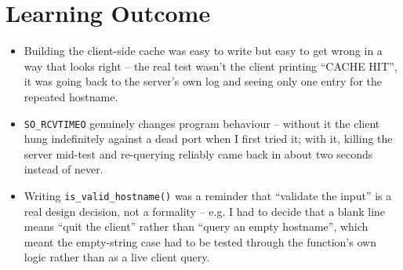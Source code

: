 \documentclass[11pt,a4paper]{article}
\begin{document}
\section*{Learning Outcome}
\begin{itemize}
\item Building the client-side cache was easy to write but easy to get wrong
in a way that looks right -- the real test wasn't the client printing
``CACHE HIT'', it was going back to the server's own log and seeing only one
entry for the repeated hostname.
\item \texttt{SO\_RCVTIMEO} genuinely changes program behaviour -- without it
the client hung indefinitely against a dead port when I first tried it; with
it, killing the server mid-test and re-querying reliably came back in about
two seconds instead of never.
\item Writing \texttt{is\_valid\_hostname()} was a reminder that ``validate
the input'' is a real design decision, not a formality -- e.g. I had to decide
that a blank line means ``quit the client'' rather than ``query an empty
hostname'', which meant the empty-string case had to be tested through the
function's own logic rather than as a live client query.
\end{itemize}
\end{document}
